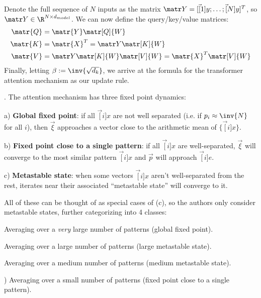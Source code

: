 \documentclass[11pt]{article}
\begin{document}
Denote the full sequence of $N$ inputs as the matrix $\matr Y = [ \vec[1]{y}; \ldots; \vec[N]{y} ]^T$, so $\matr Y \in \R^{N \times d_{model}}$. We can now define the query/key/value matrices:
\begin{align}
	\matr{Q}
		&= \matr{Y} \matr[Q]{W} \\
	\matr{K} 
		&= \matr{X}^T = \matr Y \matr[K]{W} \\
	\matr{V}
		&= \matr Y \matr[K]{W} \matr[V]{W} = \matr{X}^T \matr[V]{W}
\end{align}
Finally, letting $\beta := \inv{\sqrt{d_k}}$, we arrive at the formula for the transformer attention mechanism as our update rule. 


. The attention mechanism has three fixed point dynamics:
\begin{compactitem}
	\item[a)]  \textbf{Global fixed point}: if all $\vec[i]{x}$ are not well separated (i.e. if $p_i \approx \inv{N}$ for all $i$), then $\vec\xi$ approaches a vector close to the arithmetic mean of $\{\vec[i]{x}\}$. 
	
	 \item[b)] \textbf{Fixed point close to a single pattern}: if all $\vec[i]{x}$ are well-separated, $\vec\xi$ will converge to the most similar pattern $\vec[i]{x}$ and $\vec p$ will approach $\vec[i]{e}$. 
	
	\item[c)] \textbf{Metastable state}: when some vectors $\vec[i]{x}$ aren't well-separated from the rest, iterates near their associated ``metastable state'' will converge to it. 
\end{compactitem}
All of these can be thought of as special cases of (c), so the authors only consider metastable states, further categorizing into 4 classes:
\begin{compactitem}
	\item[\red{($\mathrm{I}$)}] Averaging over a \textit{very} large number of patterns (global fixed point). 
	\item[\orange{($\mathrm{II}$)}] Averaging over a large number of patterns (large metastable state).
	\item[\green{($\mathrm{II}$)}] Averaging over a medium number of patterns (medium metastable state). 
	\item[\blue{($\mathrm{IV}$})] Averaging over a small number of patterns (fixed point close to a single pattern). 
\end{compactitem}
\end{document}
